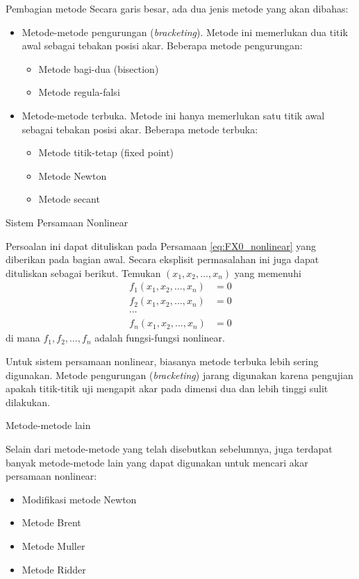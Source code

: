 \begin{frame}{Pembagian metode}
Secara garis besar, ada dua jenis metode yang akan dibahas:
\begin{itemize}\tightlist
\item Metode-metode pengurungan (\textit{bracketing}). Metode ini memerlukan
  dua titik awal sebagai tebakan posisi akar. Beberapa metode pengurungan:
  \begin{itemize}
  \item Metode bagi-dua (bisection)
  \item Metode regula-falsi
  \end{itemize}
\item Metode-metode terbuka. Metode ini hanya memerlukan satu titik awal sebagai
  tebakan posisi akar. Beberapa metode terbuka:
  \begin{itemize}
  \item Metode titik-tetap (fixed point)
  \item Metode Newton
  \item Metode secant
  \end{itemize}
\end{itemize}
\end{frame}






\begin{frame}{Sistem Persamaan Nonlinear}
\fontsize{9}{10}\selectfont

Persoalan ini dapat dituliskan pada Persamaan \eqref{eq:FX0_nonlinear}
yang diberikan pada bagian awal.
Secara eksplisit permasalahan ini juga dapat dituliskan sebagai berikut.
Temukan $(x_1, x_2, \ldots, x_n)$ yang memenuhi
\begin{align*}
f_{1} (x_1, x_2, \ldots, x_n) & = 0 \\
f_{2} (x_1, x_2, \ldots, x_n) & = 0 \\
\cdots \\
f_{n} (x_1, x_2, \ldots, x_n) & = 0
\end{align*}
di mana $f_{1}, f_{2}, \ldots, f_{n}$ adalah fungsi-fungsi nonlinear.

Untuk sistem persamaan nonlinear, biasanya metode terbuka lebih sering
digunakan. Metode pengurungan (\textit{bracketing}) jarang digunakan karena
pengujian apakah titik-titik uji mengapit akar
pada dimensi dua dan lebih tinggi sulit dilakukan.

\end{frame}


\begin{frame}{Metode-metode lain}

Selain dari metode-metode yang telah disebutkan sebelumnya, juga
terdapat banyak metode-metode lain yang dapat digunakan untuk mencari
akar persamaan nonlinear:
\begin{itemize}\tightlist
\item Modifikasi metode Newton
\item Metode Brent
\item Metode Muller
\item Metode Ridder
\end{itemize}

\end{frame}



